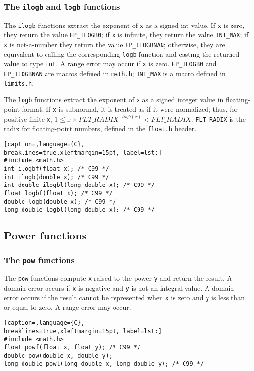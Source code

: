 \subsubsection{The \texttt{ilogb} and \texttt{logb} functions}
The \texttt{ilogb} functions extract the exponent of \texttt{x} as a signed int
value. If \texttt{x} is zero, they return the value \texttt{FP\_ILOGB0}; if
\texttt{x} is infinite, they return the value \texttt{INT\_MAX}; if \texttt{x}
is not-a-number they return the value \texttt{FP\_ILOGBNAN}; otherwise, they
are equivalent to calling the corresponding \texttt{logb} function and casting
the returned value to type \texttt{int}. A range error may occur if \texttt{x}
is zero. \texttt{FP\_ILOGB0} and \texttt{FP\_ILOGBNAN} are macros defined in
\texttt{math.h}; \texttt{INT\_MAX} is a macro defined in \texttt{limits.h}.

The \texttt{logb} functions extract the exponent of \texttt{x} as a signed
integer value in floating-point format. If \texttt{x} is subnormal, it is
treated as if it were normalized; thus, for positive finite \texttt{x},
$1 \leq x \times FLT\_RADIX^{-logb(x)} < FLT\_RADIX$.
\texttt{FLT\_RADIX} is the radix for floating-point numbers, defined in the
\texttt{float.h} header.
\lstset{basicstyle=\scriptsize, numbers=left, captionpos=b, tabsize=4}
\begin{lstlisting}[caption=,language={C},
breaklines=true,xleftmargin=15pt, label=lst:]
#include <math.h>
int ilogbf(float x); /* C99 */
int ilogb(double x); /* C99 */
int double ilogbl(long double x); /* C99 */
float logbf(float x); /* C99 */
double logb(double x); /* C99 */
long double logbl(long double x); /* C99 */
\end{lstlisting}

\subsection{Power functions}
\subsubsection{The \texttt{pow} functions}
The \texttt{pow} functions compute \texttt{x} raised to the power \texttt{y}
and return the result. A domain error occurs if \texttt{x} is negative and
\texttt{y} is not an integral value. A domain error occurs if the result cannot
be represented when \texttt{x} is zero and \texttt{y} is less than or equal to
zero. A range error may occur.
\lstset{basicstyle=\scriptsize, numbers=left, captionpos=b, tabsize=4}
\begin{lstlisting}[caption=,language={C},
breaklines=true,xleftmargin=15pt, label=lst:]
#include <math.h>
float powf(float x, float y); /* C99 */
double pow(double x, double y);
long double powl(long double x, long double y); /* C99 */
\end{lstlisting}

